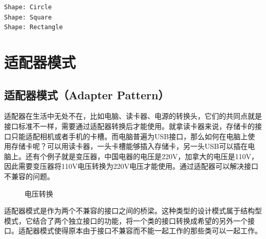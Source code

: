 \begin{tcolorbox}
    \begin{verbatim}
Shape: Circle
Shape: Square
Shape: Rectangle
\end{verbatim}
\end{tcolorbox}

\newpage

\section{适配器模式}

\subsection{适配器模式（Adapter Pattern）}

适配器在生活中无处不在，比如电脑、读卡器、电源的转换头，它们的共同点就是接口标准不一样，需要通过适配器转换后才能使用。就拿读卡器来说，存储卡的接口只能适配相机或者手机的卡槽。而电脑普遍为USB接口，那么如何在电脑上使用存储卡呢？可以用读卡器，一头卡槽能够插入存储卡，另一头USB可以插在电脑上。还有个例子就是变压器，中国电器的电压是220V，加拿大的电压是110V，因此需要变压器将110V电压转换为220V电压才能使用。通过适配器可以解决接口不兼容的问题。

\begin{figure}[H]
    \centering
    \caption{电压转换}
\end{figure}

适配器模式是作为两个不兼容的接口之间的桥梁。这种类型的设计模式属于结构型模式，它结合了两个独立接口的功能，将一个类的接口转换成希望的另外一个接口。适配器模式使得原本由于接口不兼容而不能一起工作的那些类可以一起工作。\\

\\

